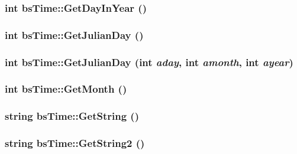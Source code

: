 \hypertarget{classbs_time_a91f0b41e938320843b362bed6bc87ef2}{
\subsubsection[{GetDayInYear}]{\setlength{\rightskip}{0pt plus 5cm}int bsTime::GetDayInYear ()}}
\label{classbs_time_a91f0b41e938320843b362bed6bc87ef2}
\hypertarget{classbs_time_a77148a065ee3c24e2e06f2f919bfe5f0}{
\subsubsection[{GetJulianDay}]{\setlength{\rightskip}{0pt plus 5cm}int bsTime::GetJulianDay ()}}
\label{classbs_time_a77148a065ee3c24e2e06f2f919bfe5f0}
\hypertarget{classbs_time_af5a34894c96b25a0ba8cf2a15d94e714}{
\subsubsection[{GetJulianDay}]{\setlength{\rightskip}{0pt plus 5cm}int bsTime::GetJulianDay (int {\em aday}, \/  int {\em amonth}, \/  int {\em ayear})}}
\label{classbs_time_af5a34894c96b25a0ba8cf2a15d94e714}
\hypertarget{classbs_time_a777a59c97951688c4b2a67c4b0bca16e}{
\subsubsection[{GetMonth}]{\setlength{\rightskip}{0pt plus 5cm}int bsTime::GetMonth ()}}
\label{classbs_time_a777a59c97951688c4b2a67c4b0bca16e}
\hypertarget{classbs_time_a3ad52506fb6d6f8501d1d52eb00efb0d}{
\subsubsection[{GetString}]{\setlength{\rightskip}{0pt plus 5cm}string bsTime::GetString ()}}
\label{classbs_time_a3ad52506fb6d6f8501d1d52eb00efb0d}
\hypertarget{classbs_time_a3573b9448deb1114eb32070d3c179cee}{
\subsubsection[{GetString2}]{\setlength{\rightskip}{0pt plus 5cm}string bsTime::GetString2 ()}}
